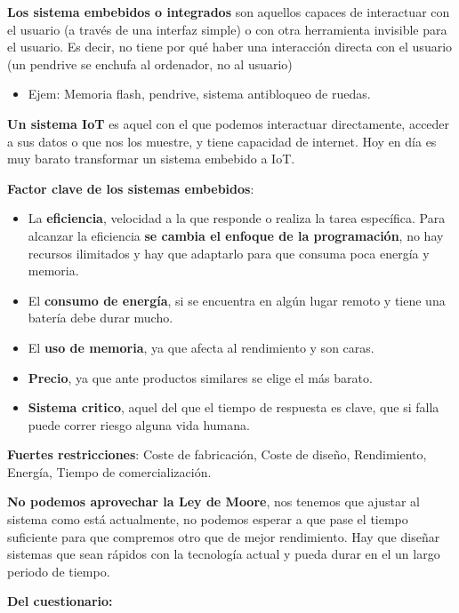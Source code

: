 \documentclass[12pt]{report} %
\begin{document}
\textbf{Los sistema embebidos o integrados} son aquellos capaces de
interactuar con el usuario (a través de una interfaz simple) o con otra herramienta invisible para el usuario. Es decir, no tiene por qué haber una interacción directa con el usuario (un pendrive se enchufa al ordenador, no al usuario)

\begin{itemize}

\item
  Ejem: Memoria flash, pendrive, sistema antibloqueo de ruedas.
\end{itemize}

\textbf{Un sistema IoT} es aquel con el que podemos interactuar
directamente, acceder a sus datos o que nos los muestre, y tiene
capacidad de internet. Hoy en día es muy barato transformar un sistema
embebido a IoT.

\textbf{Factor clave de los sistemas embebidos}:

\begin{itemize}

\item
  La \textbf{eficiencia}, velocidad a la que responde o realiza la tarea
  específica. Para alcanzar la eficiencia \textbf{se cambia el enfoque
  de la programación}, no hay recursos ilimitados y hay que adaptarlo
  para que consuma poca energía y memoria.
\item
  El \textbf{consumo de energía}, si se encuentra en algún lugar remoto
  y tiene una batería debe durar mucho.
\item
  El \textbf{uso de memoria}, ya que afecta al rendimiento y son caras.
\item
  \textbf{Precio}, ya que ante productos similares se elige el más
  barato.
\item
  \textbf{Sistema critico}, aquel del que el tiempo de respuesta es
  clave, que si falla puede correr riesgo alguna vida humana.
\end{itemize}

\textbf{Fuertes restricciones}: Coste de fabricación, Coste de diseño, Rendimiento, Energía, Tiempo de comercialización.

\textbf{No podemos aprovechar la Ley de Moore}, nos tenemos que ajustar
al sistema como está actualmente, no podemos esperar a que pase el
tiempo suficiente para que compremos otro que de mejor rendimiento. Hay
que diseñar sistemas que sean rápidos con la tecnología actual y pueda
durar en el un largo periodo de tiempo.

\textbf{Del cuestionario:}
\end{document}
